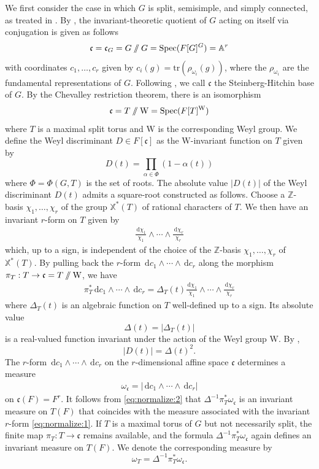\documentclass[iccmp]{ipbook}
\newcommand{\BA}{{\mathbb {A}}}
\newcommand{\BX}{{\mathbb {X}}}
\newcommand{\BZ}{{\mathbb {Z}}}
\newcommand{\Fc}{{\mathfrak {c}}}
\newcommand{\RW}{{\mathrm {W}}}
\newcommand{\Spec}{{\mathrm{Spec}}}
\newcommand{\tr}{{\mathrm{tr}}}
\newcommand{\ud}{\,\mathrm{d}}
\def\alp{{\alpha}}
\def\Del{{\Delta}}
\def\ome{{\omega}}
\newcommand{\sslash}{\mathbin{/\mkern-6mu/}}
\begin{document}
We first consider the case in which $G$ is split, semisimple, and simply connected, as treated in \cite[\S 3.1]{LN}. By \cite{Steinberg-conjugacy}, the invariant-theoretic quotient of $G$ acting on itself via conjugation is given as follows
$$
\Fc=\Fc_G=G\sslash G=\Spec(F[G]^G) = \BA^r
$$
with coordinates $c_1,\ldots,c_r$ given by $c_i(g) = \tr(\rho_{\ome_i}(g))$, where the $\rho_{\ome_i}$ are the fundamental representations of $G$. Following \cite{FLN10}, we call $\Fc$ the Steinberg-Hitchin base of $G$. By the Chevalley restriction theorem, there is an isomorphism
$$
\Fc=T\sslash \RW = \Spec(F[T]^\RW)
$$
where $T$ is a maximal split torus and $\RW$ is the corresponding Weyl group. We define the Weyl discriminant $D\in F[\Fc]$ as the $\RW$-invariant function on $T$ given by 
$$
D(t) = \prod_{\alp\in \Phi}(1-\alp(t))
$$
where $\Phi = \Phi(G,T)$ is the set of roots. The absolute value $|D(t)|$ of the Weyl discriminant $D(t)$ admits a square-root constructed as follows. Choose a $\BZ$-basis $\chi_1,\ldots,\chi_r$ of the group $\BX^*(T)$ of rational characters of $T$. We then have an invariant $r$-form on $T$ given by
\begin{align}\label{eq:normalize:1}
\frac{\ud \chi_1}{\chi_1}
\wedge\cdots\wedge\frac{\ud \chi_r}{\chi_r}
\end{align}
which, up to a sign, is independent of the choice of the $\BZ$-basis $\chi_1,\ldots,\chi_r$ of $\BX^*(T)$. By pulling back the $r$-form $\ud c_1\wedge\cdots\wedge \ud c_r$ along the morphism $\pi_T:T\to \Fc = T\sslash \RW$, we have
\begin{align}\label{eq:normalize:2}
\pi^*_T
\ud c_1\wedge\cdots\wedge \ud c_r =
\Del_T(t)
\frac{\ud \chi_1}{\chi_1}
\wedge\cdots\wedge
\frac{\ud \chi_r}{\chi_r}
\end{align}
where $\Del_T(t)$ is an algebraic function on $T$ well-defined up to a sign. Its absolute value 
$$
\Del(t) = |\Del_T(t)|
$$
is a real-valued function invariant under the action of the Weyl group $\RW$. By \cite[Prop.~3.29]{FLN10},
$$
|D(t)| = \Del(t)^2.
$$
The $r$-form $\ud c_1\wedge\cdots\wedge \ud c_r$ on the $r$-dimensional affine space $\Fc$ determines a measure
\begin{align}\label{eq:normalize:3}
\ome_\Fc = |\ud c_1\wedge\cdots\wedge \ud c_r|
\end{align}
on $\Fc(F) = F^r$. It follows from \eqref{eq:normalize:2} that $\Del^{-1}\pi^*_T\ome_\Fc$ is an invariant measure on $T(F)$ that coincides with the measure associated with the invariant $r$-form \eqref{eq:normalize:1}. If $T$ is a maximal torus of $G$ but not necessarily split, the finite map $\pi_T:T\to \Fc$ remains available, and the formula $\Del^{-1}\pi^*_T\ome_\Fc$ again defines an invariant measure on $T(F)$. We denote the corresponding measure by
$$
\ome_T = \Del^{-1}\pi^*_T\ome_\Fc.
$$
\end{document}
